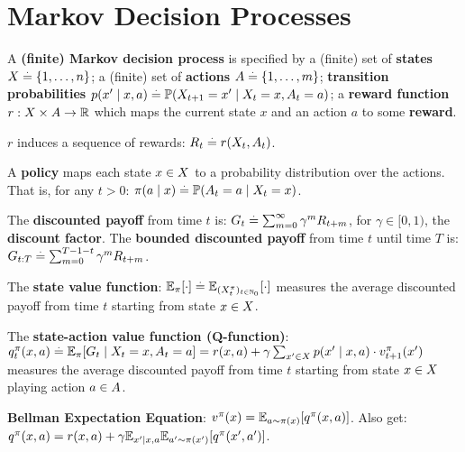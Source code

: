 \section{Markov Decision Processes}
\begin{framed}
    A \textbf{(finite) Markov decision process} is specified by a (finite) set of \textbf{states} $X \overset{.}{=} \{1, \dots, n\}$; a (finite) set of \textbf{actions} $A \overset{.}{=} \{1, \dots, m\}$; \textbf{transition probabilities} ${p(x' \mid x, a) \defeq \Pr{X_{t+1} = x' \mid X_t = x, A_t = a}}$; a \textbf{reward function} $r : X \times A \to \mathbb{R}$ which maps the current state $x$ and an action $a$ to some \textbf{reward}.
\end{framed}
$r$ induces a sequence of rewards: $R_t \overset{.}{=} r(X_t, A_t)$.
\begin{framed}
    A \textbf{policy} maps each state $x \in X$ to a probability distribution over the actions. That is, for any $t > 0$: $\pi(a \mid x) \defeq \Pr{A_t = a \mid X_t = x}$.
\end{framed}
The \textbf{discounted payoff} from time $t$ is: $G_t \overset{.}{=} \sum_{m=0}^\infty \gamma^m R_{t+m}$, for $\gamma \in [0, 1)$, the \textbf{discount factor}.
The \textbf{bounded discounted payoff} from time $t$ until time \(T\) is: $G_{t:T} \overset{.}{=} \sum_{m=0}^{T-1-t} \gamma^m R_{t+m}$.
\begin{framed}
    The \textbf{state value function}: $\E[\pi]{\cdot} \defeq \E[(X_t^\pi)_{t\in\Nat_0}]{\cdot}$ measures the average discounted payoff from time $t$ starting from state $x \in X$.
\end{framed}
\begin{framed}
    The \textbf{state-action value function (Q-function)}: $\q[\pi]{x}{a}[t] \defeq \E[\pi]{G_t \mid X_t = x, A_t = a} = r(x, a) + \gamma \sum_{x' \in \sX} p(x' \mid x, a) \cdot \v[\pi]{x'}[t+1]$ measures the average discounted payoff from time $t$ starting from state $x \in X$ playing action $a \in A$.
\end{framed}
\begin{framed}
    \textbf{Bellman Expectation Equation}: 
    $\v[\pi]{x} = \E[a \sim \pi(x)]{\q[\pi]{x}{a}}$. Also get: $\q[\pi]{x}{a} = r(x, a) + \gamma \E*[x' \mid x, a]{\E[a' \sim \pi(x')]{\q[\pi]{x'}{a'}}}$.
\end{framed}
